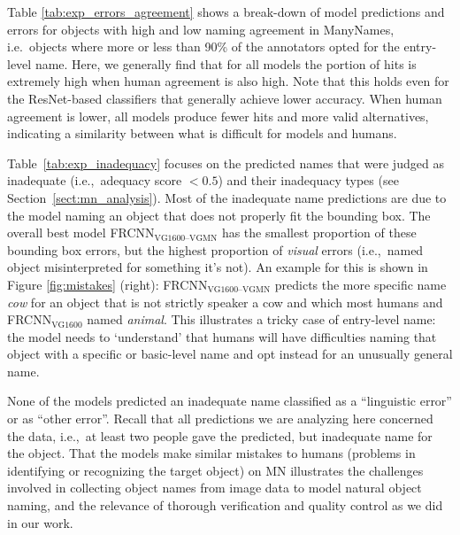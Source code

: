 Table \ref{tab:exp_errors_agreement} shows a break-down of model predictions and errors for objects with high and low naming agreement in ManyNames, i.e.\ objects where more or less than 90\% of the annotators opted for the entry-level name. 
Here, we generally find that for all models the portion of hits is extremely high when human agreement is also high.
Note that this holds even for the ResNet-based classifiers that generally achieve lower accuracy.
When human agreement is lower, all models produce fewer hits and more valid alternatives, indicating a similarity between what is difficult for models and humans.

Table~\ref{tab:exp_inadequacy} focuses on the predicted \mn names that were judged as inadequate (i.e.,~adequacy score \mbox{$<0.5$}) and their inadequacy types (see Section~\ref{sect:mn_analysis}).
Most of the inadequate name predictions are due to the model naming an object that does not properly fit the bounding box. 
The overall best model FRCNN$_{\text{VG1600--VGMN}}$ has the smallest proportion of these bounding box errors, but the highest proportion of \textit{visual} errors (i.e.,~named object misinterpreted for something it's not). 
An example for this is shown in Figure \ref{fig:mistakes} (right): FRCNN$_{\text{VG1600--VGMN}}$ predicts the more specific name \textit{cow} for an object that is not strictly speaker a cow and which most humans and FRCNN$_{\text{VG1600}}$ named \textit{animal}.
This illustrates a tricky case of entry-level name: the model needs to `understand' that humans will have difficulties naming that object with a specific or basic-level name and opt instead for an unusually general name.

%
None of the models predicted an inadequate name classified as a ``linguistic error'' or as ``other error''.
Recall that all predictions we are analyzing here concerned the \mn data, i.e.,~at least two people gave the predicted, but inadequate name for the object. 
That the models make similar mistakes to humans (problems in identifying or recognizing the target object) on MN illustrates the challenges involved in collecting object names from image data to model natural object naming, and the relevance of thorough verification and quality control as we did in our work.  


